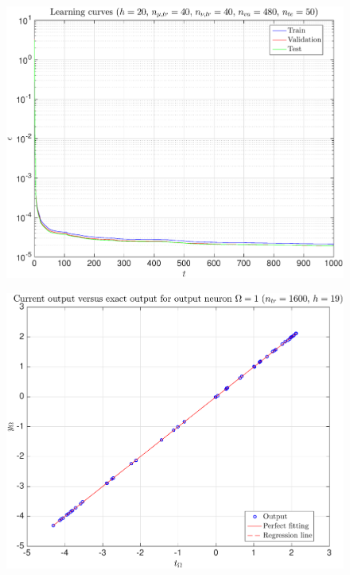 \documentclass[11pt,a4paper]{article}
\theoremstyle{definition}
\theoremstyle{theorem}
\numberwithin{equation}{section}
\begin{document}
	\begin{figure}[H]
		\center
		\includegraphics[scale = 0.5]{fig3}
		\caption{}
	\end{figure}
	
	\begin{figure}[H]
		\center
		\includegraphics[scale = 0.5]{fig4}
		\caption{}
	\end{figure}
	
\end{document}
